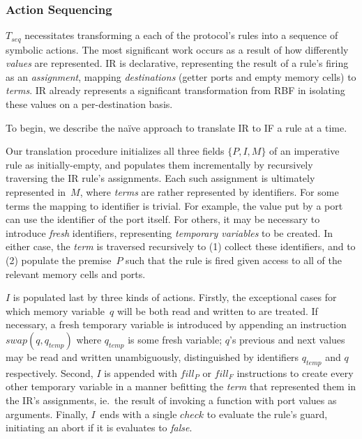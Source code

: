 \subsubsection{Action Sequencing}
$T_{seq}$ necessitates transforming a each of the protocol's rules into a sequence of symbolic actions. The most significant work occurs as a result of how differently \textit{values} are represented. IR is declarative, representing the result of a rule's firing as an \textit{assignment}, mapping \textit{destinations} (getter ports and empty memory cells) to \textit{terms}. IR already represents a significant transformation from RBF in isolating these values on a per-destination basis. 

To begin, we describe the na\"ive approach to translate IR to IF a rule at a time.

Our translation procedure initializes all three fields $\{P, I, M\}$ of an imperative rule as initially-empty, and populates them incrementally by recursively traversing the IR rule's assignments. Each such assignment is ultimately represented in~$M$, where \textit{terms} are rather represented by identifiers. For some terms the mapping to identifier is trivial. For example, the value put by a port can use the identifier of the port itself. For others, it may be necessary to introduce \textit{fresh} identifiers, representing \textit{temporary variables} to be created. In either case, the \textit{term} is traversed recursively to (1) collect these identifiers, and to (2) populate the premise~$P$ such that the rule is fired given access to all of the relevant memory cells and ports.

$I$ is populated last by three kinds of actions. Firstly, the exceptional cases for which memory variable~$q$ will be both read and written to are treated. If necessary, a fresh temporary variable is introduced by appending an instruction $swap(q, q_{temp})$ where $q_{temp}$ is some fresh variable; $q$'s previous and next values may be read and written unambiguously, distinguished by identifiers $q_{temp}$ and $q$ respectively. Second, $I$ is appended with $fill_P$ or $fill_F$ instructions to create every other temporary variable in a manner befitting the \textit{term} that represented them in the IR's assignments, ie.\ the result of invoking a function with port values as arguments. Finally, $I$~ends with a single $check$ to evaluate the rule's guard, initiating an abort if it is evaluates to \textit{false}.


